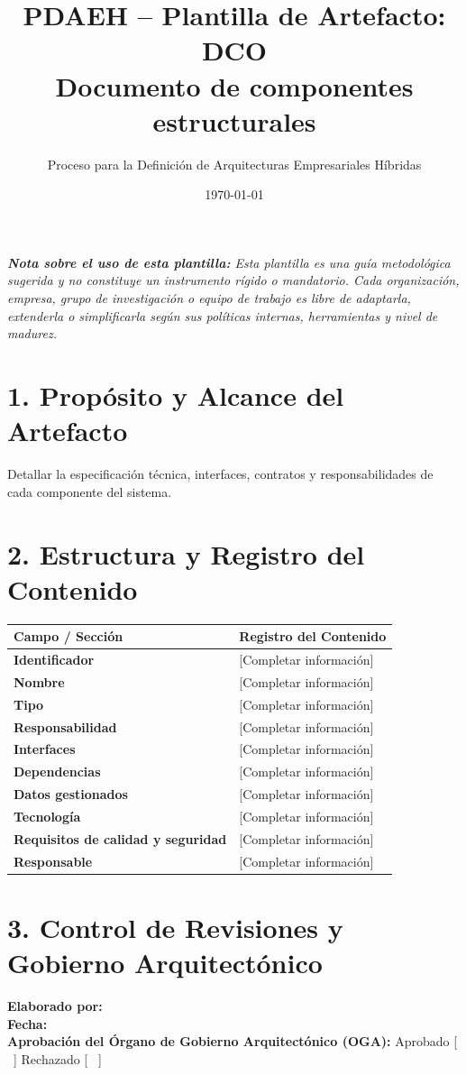 \documentclass[11pt,a4paper]{article}
\title{\textbf{\color{brandgreen} PDAEH -- Plantilla de Artefacto: DCO} \\[0.3em] \large Documento de componentes estructurales}
\author{Proceso para la Definición de Arquitecturas Empresariales Híbridas}
\date{\today}
\begin{document}
\maketitle

\noindent \textit{\textbf{Nota sobre el uso de esta plantilla:} Esta plantilla es una guía metodológica sugerida y no constituye un instrumento rígido o mandatorio. Cada organización, empresa, grupo de investigación o equipo de trabajo es libre de adaptarla, extenderla o simplificarla según sus políticas internas, herramientas y nivel de madurez.}

\section*{1. Propósito y Alcance del Artefacto}
Detallar la especificación técnica, interfaces, contratos y responsabilidades de cada componente del sistema.

\section*{2. Estructura y Registro del Contenido}
\begin{tabularx}{\textwidth}{|>{\bfseries}p{4.5cm}|X|}
    \hline
    \rowcolor[gray]{0.92} Campo / Sección & Registro del Contenido \\ \hline
    \textbf{Identificador} & [Completar información] \\ \hline
    \textbf{Nombre} & [Completar información] \\ \hline
    \textbf{Tipo} & [Completar información] \\ \hline
    \textbf{Responsabilidad} & [Completar información] \\ \hline
    \textbf{Interfaces} & [Completar información] \\ \hline
    \textbf{Dependencias} & [Completar información] \\ \hline
    \textbf{Datos gestionados} & [Completar información] \\ \hline
    \textbf{Tecnología} & [Completar información] \\ \hline
    \textbf{Requisitos de calidad y seguridad} & [Completar información] \\ \hline
    \textbf{Responsable} & [Completar información] \\ \hline
\end{tabularx}

\vspace{1.2cm}
\section*{3. Control de Revisiones y Gobierno Arquitectónico}
\noindent \textbf{Elaborado por:} \hrulefill \\[0.5em]
\textbf{Fecha:} \hrulefill \\[0.5em]
\textbf{Aprobación del Órgano de Gobierno Arquitectónico (OGA):} Aprobado [ \, ] \quad Rechazado [ \, ]
\end{document}
